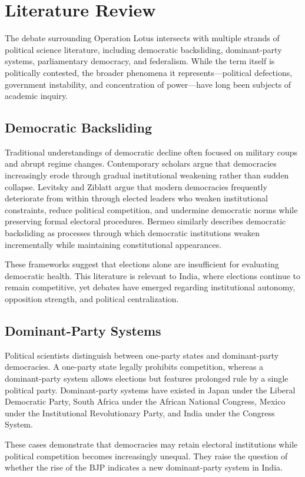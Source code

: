 \documentclass[11pt]{article}
\begin{document}
\section{Literature Review}
The debate surrounding Operation Lotus intersects with multiple strands of political science literature, including democratic backsliding, dominant-party systems, parliamentary democracy, and federalism. While the term itself is politically contested, the broader phenomena it represents---political defections, government instability, and concentration of power---have long been subjects of academic inquiry.

\subsection{Democratic Backsliding}
Traditional understandings of democratic decline often focused on military coups and abrupt regime changes. Contemporary scholars argue that democracies increasingly erode through gradual institutional weakening rather than sudden collapse. Levitsky and Ziblatt argue that modern democracies frequently deteriorate from within through elected leaders who weaken institutional constraints, reduce political competition, and undermine democratic norms while preserving formal electoral procedures. Bermeo similarly describes democratic backsliding as processes through which democratic institutions weaken incrementally while maintaining constitutional appearances.

These frameworks suggest that elections alone are insufficient for evaluating democratic health. This literature is relevant to India, where elections continue to remain competitive, yet debates have emerged regarding institutional autonomy, opposition strength, and political centralization.

\subsection{Dominant-Party Systems}
Political scientists distinguish between one-party states and dominant-party democracies. A one-party state legally prohibits competition, whereas a dominant-party system allows elections but features prolonged rule by a single political party. Dominant-party systems have existed in Japan under the Liberal Democratic Party, South Africa under the African National Congress, Mexico under the Institutional Revolutionary Party, and India under the Congress System.

These cases demonstrate that democracies may retain electoral institutions while political competition becomes increasingly unequal. They raise the question of whether the rise of the BJP indicates a new dominant-party system in India.
\end{document}
